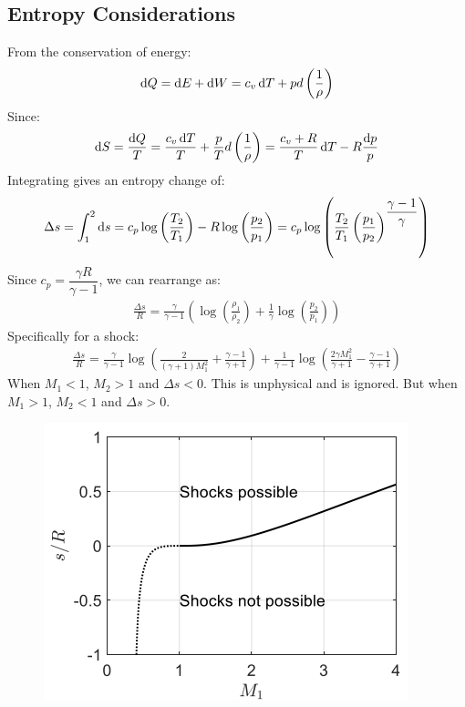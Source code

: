 \subsection{Entropy Considerations}
From the conservation of energy:
\begin{gather}
    \dif Q = \dif E + \dif W = c_v\dif T + pd\left(\frac{1}{\rho}\right)
\end{gather}
Since:
\begin{gather}
    \dif S = \frac{\dif Q}{T}= \frac{c_v \dif T}{T} + \frac{p}{T}d\left(\frac{1}{\rho}\right) = \frac{c_v+R}{T}\dif T - R\frac{\dif p}{p}
\end{gather}
Integrating gives an entropy change of:
\begin{gather}
    \Delta s = \int_{1}^{2}\dif s = c_p \log\left(\frac{T_2}{T_1}\right) - R\log\left(\frac{p_2}{p_1}\right) = c_p\log \left( \frac{T_2}{T_1} \left(\frac{p_1}{p_2}\right)^{\dfrac{\gamma-1}{\gamma}} \right)
\end{gather}
Since $c_p = \dfrac{\gamma R}{\gamma-1}$, we can rearrange as:
\begin{gather}
    \frac{\Delta s}{R} = \frac{\gamma}{\gamma-1} \left( \log\left(\frac{\rho_1}{\rho_2}\right) + \frac{1}{\gamma}\log\left(\frac{p_2}{p_1}\right) \right)
\end{gather}
Specifically for a shock:
\begin{gather}
    \frac{\Delta s}{R} = \frac{\gamma}{\gamma-1}\log \left( \frac{2}{(\gamma+1)M_1^2} + \frac{\gamma-1}{\gamma+1} \right) + \frac{1}{\gamma-1}\log \left( \frac{2\gamma M_1^2}{\gamma+1} - \frac{\gamma-1}{\gamma+1} \right)
\end{gather}
When $M_1<1$, $M_2>1$ and $\Delta s<0$. This is unphysical and is ignored. But when $M_1>1$, $M_2<1$ and $\Delta s>0$.
\begin{figure}[H]
    \centering
    \includegraphics[width = 0.55 \textwidth]{./img/diagram7.PNG}
    \caption{}
\end{figure}
